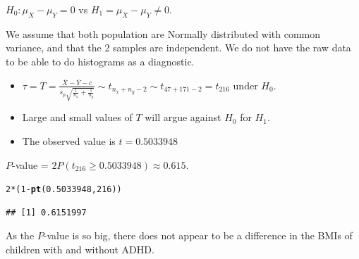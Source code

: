 \documentclass[t,xcolor=pdftex,dvipsnames,table]{beamer}
\makeatletter
\newcommand{\hlnum}[1]{\textcolor[rgb]{0.686,0.059,0.569}{#1}}%
\newcommand{\hlopt}[1]{\textcolor[rgb]{0,0,0}{#1}}%
\newcommand{\hlstd}[1]{\textcolor[rgb]{0.345,0.345,0.345}{#1}}%
\newcommand{\hlkwd}[1]{\textcolor[rgb]{0.737,0.353,0.396}{\textbf{#1}}}%
\newenvironment{kframe}{%
 \def\at@end@of@kframe{}%
 \ifinner\ifhmode%
  \def\at@end@of@kframe{\end{minipage}}%
  \begin{minipage}{\columnwidth}%
 \fi\fi%
 \def\FrameCommand##1{\hskip\@totalleftmargin \hskip-\fboxsep
 \colorbox{shadecolor}{##1}\hskip-\fboxsep
     \hskip-\linewidth \hskip-\@totalleftmargin \hskip\columnwidth}%
 \MakeFramed {\advance\hsize-\width
   \@totalleftmargin\z@ \linewidth\hsize
   \@setminipage}}%
 {\par\unskip\endMakeFramed%
 \at@end@of@kframe}
\newenvironment{knitrout}{}{} %
\makeatother
\begin{document}
\begin{frame}[fragile]{}
$H_{0}: \mu_{X} - \mu_{Y} = 0$ vs $H_{1} =  \mu_{X} - \mu_{Y} \neq  0$.

\vspace{.5cm}
 We assume that both population are Normally distributed with common variance, and that the 2 samples are independent. We do not have the raw data to be able to do histograms as a diagnostic.

\begin{itemize}
\item $\tau = T = \frac{ \bar{X} - \bar{Y} - c }{ s_{p}  \sqrt{ \frac{1}{n_{x}} + \frac{1}{n_{y}} }}  \sim t_{ n_{x} + n_{y}-2 } \sim t_{47+171-2} = t_{216}$ under $H_{0}$. 
\item Large and small values of $T$ will argue against $H_{0}$ for $H_{1}$. 
\item The observed value is $t=  0.5033948$
\end{itemize}

\vspace{.5cm}
 $P$-value = $2 P( t_{216} \geq 0.5033948) \approx  0.615$.

\begin{knitrout}
\color{fgcolor}\begin{kframe}
\begin{alltt}
\hlnum{2}\hlopt{*}\hlstd{(}\hlnum{1}\hlopt{-}\hlkwd{pt}\hlstd{(}\hlnum{0.5033948}\hlstd{,}\hlnum{216}\hlstd{))}
\end{alltt}
\begin{verbatim}
## [1] 0.6151997
\end{verbatim}
\end{kframe}
\end{knitrout}
\end{frame}  

\begin{frame}[fragile]{}
 As the $P$-value is so big, there does not appear to be a difference in the BMIs of children with and without ADHD.
\end{frame} 
\end{document}
